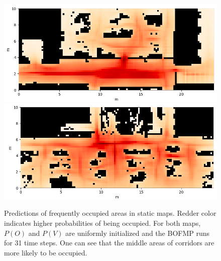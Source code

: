 \begin{figure}[ht]
  \centering
    \includegraphics[width=\textwidth]{figures/average_occupancy_3.png} \\
    \includegraphics[width=\textwidth]{figures/average_occupancy_4.png} \\
    \caption[Predictions of frequently occupied areas in static maps.]{Predictions of frequently occupied areas in static maps. Redder color indicates higher probabilities of being occupied. For both maps, $P(O)$ and $P(V)$ are uniformly initialized and the BOFMP runs for 31 time steps. One can see that the middle areas of corridors are more likely to be occupied.} 
    \label{fig:average_occupancy_pred}
\end{figure}


 